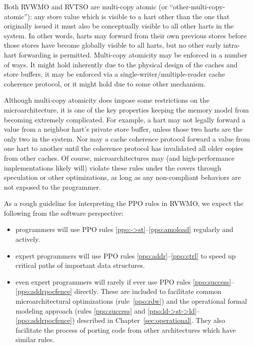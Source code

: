 Both RVWMO and RVTSO are multi-copy atomic (or ``other-multi-copy-atomic''): any store value which is visible to a hart other than the one that originally issued it must also be conceptually visible to all other harts in the system.
In other words, harts may forward from their own previous stores before those stores have become globally visible to all harts, but no other early intra-hart forwarding is permitted.
Multi-copy atomicity may be enforced in a number of ways.
It might hold inherently due to the physical design of the caches and store buffers, it may be enforced via a single-writer/multiple-reader cache coherence protocol, or it might hold due to some other mechanism.

Although multi-copy atomicity does impose some restrictions on the microarchitecture, it is one of the key properties keeping the memory model from becoming extremely complicated.
For example, a hart may not legally forward a value from a neighbor hart's private store buffer, unless those two harts are the only two in the system.
Nor may a cache coherence protocol forward a value from one hart to another until the coherence protocol has invalidated all older copies from other caches.
Of course, microarchitectures may (and high-performance implementations likely will) violate these rules under the covers through speculation or other optimizations, as long as any non-compliant behaviors are not exposed to the programmer.

As a rough guideline for interpreting the PPO rules in RVWMO, we expect the following from the software perspective:
\begin{itemize}
  \item programmers will use PPO rules \ref{ppo:->st}--\ref{ppo:amoload} regularly and actively.
  \item expert programmers will use PPO rules \ref{ppo:addr}--\ref{ppo:ctrl} to speed up critical paths of important data structures.
  \item even expert programmers will rarely if ever use PPO rules \ref{ppo:success}--\ref{ppo:addrpocfence} directly.  These are included to facilitate common microarchitectural optimizations (rule~\ref{ppo:rdw}) and the operational formal modeling approach (rules \ref{ppo:success} and \ref{ppo:ld->st->ld}--\ref{ppo:addrpocfence}) described in Chapter~\ref{sec:operational}.  They also facilitate the process of porting code from other architectures which have similar rules.
\end{itemize}

